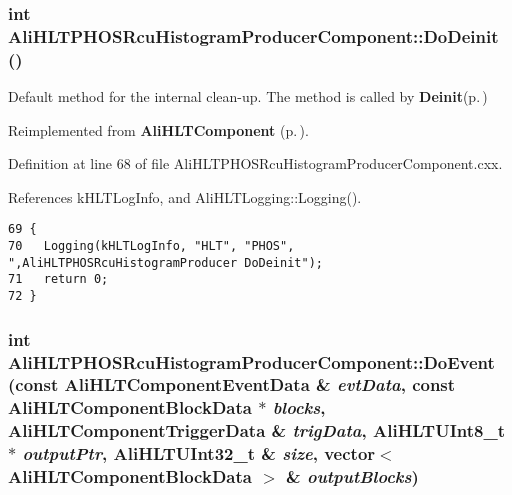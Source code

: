 \subsubsection{\setlength{\rightskip}{0pt plus 5cm}int Ali\-HLTPHOSRcu\-Histogram\-Producer\-Component::Do\-Deinit ()\hspace{0.3cm}{\tt  [virtual]}}\label{classAliHLTPHOSRcuHistogramProducerComponent_a4}


Default method for the internal clean-up. The method is called by {\bf Deinit}{\rm (p.\,\pageref{classAliHLTPHOSRcuHistogramProducerComponent_a3})} 

Reimplemented from {\bf Ali\-HLTComponent} {\rm (p.\,\pageref{classAliHLTComponent_b6})}.

Definition at line 68 of file Ali\-HLTPHOSRcu\-Histogram\-Producer\-Component.cxx.

References k\-HLTLog\-Info, and Ali\-HLTLogging::Logging().

\footnotesize\begin{verbatim}69 {
70   Logging(kHLTLogInfo, "HLT", "PHOS", ",AliHLTPHOSRcuHistogramProducer DoDeinit");
71   return 0;
72 }
\end{verbatim}\normalsize 


\subsubsection{\setlength{\rightskip}{0pt plus 5cm}int Ali\-HLTPHOSRcu\-Histogram\-Producer\-Component::Do\-Event (const {\bf Ali\-HLTComponent\-Event\-Data} \& {\em evt\-Data}, const {\bf Ali\-HLTComponent\-Block\-Data} $\ast$ {\em blocks}, {\bf Ali\-HLTComponent\-Trigger\-Data} \& {\em trig\-Data}, {\bf Ali\-HLTUInt8\_\-t} $\ast$ {\em output\-Ptr}, {\bf Ali\-HLTUInt32\_\-t} \& {\em size}, vector$<$ {\bf Ali\-HLTComponent\-Block\-Data} $>$ \& {\em output\-Blocks})\hspace{0.3cm}{\tt  [virtual]}}\label{classAliHLTPHOSRcuHistogramProducerComponent_a5}


